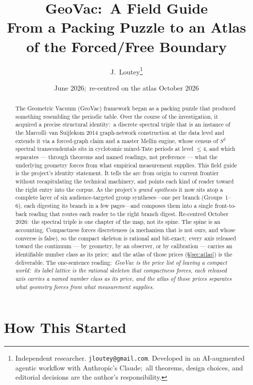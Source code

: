 \documentclass[11pt,a4paper]{article}
\title{GeoVac:\ A Field Guide \\
\large From a Packing Puzzle to an Atlas of the Forced/Free Boundary}
\author{J.~Loutey\thanks{Independent researcher.
\texttt{jloutey@gmail.com}.  Developed in an AI-augmented agentic
workflow with Anthropic's Claude;\ all theorems, design choices, and
editorial decisions are the author's responsibility.}}
\date{June 2026;\ re-centred on the atlas October 2026}
\newcommand{\sthree}{S^{3}}
\begin{document}
\maketitle

\begin{abstract}
The Geometric Vacuum (GeoVac) framework began as a packing puzzle that
produced something resembling the periodic table.  Over the course
of the investigation, it acquired a precise structural identity:\ a
discrete spectral triple that is an instance of the Marcolli--van
Suijlekom 2014 graph-network construction at the data level and
extends it via a forced-graph claim and a master Mellin engine,
whose census of $\sthree$ spectral transcendentals sits in cyclotomic
mixed-Tate periods at level $\le 4$, and which separates --- through
theorems and named readings, not preference --- what the underlying
geometry forces from what empirical measurement supplies.  This field guide is the project's
identity statement.  It tells the arc from origin to current frontier
without recapitulating the technical machinery, and points each kind
of reader toward the right entry into the corpus.  As the project's \emph{grand
synthesis} it now sits atop a complete layer of six audience-targeted
group syntheses---one per branch (Groups~1--6), each digesting its
branch in a few pages---and composes them into a single front-to-back
reading that routes each reader to the right branch digest.
Re-centred October 2026:\ the spectral triple is one chapter of the
map, not its spine.  The spine is an accounting.  Compactness forces
discreteness (a mechanism that is not ours, and whose converse is
false), so the compact skeleton is rational and bit-exact;\ every axis
released toward the continuum --- by geometry, by an observer, or by
calibration --- carries an identifiable number class as its price;\ and
the atlas of those prices (\S\ref{sec:atlas}) is the deliverable.  The
one-sentence
reading:\ \emph{GeoVac is the price list of leaving a compact world:\
its label lattice is the rational skeleton that compactness forces, each
released axis carries a named number class as its price, and the atlas
of those prices separates what geometry forces from what measurement
supplies.}
\end{abstract}

\tableofcontents

\section{How This Started}
\label{sec:origin}
\end{document}
